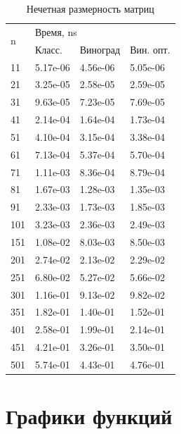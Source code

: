 \begin{table}[ht!]
\begin{subtable}[ht!]{0.45\textwidth}
		\caption{Нечетная размерность матриц}
		\begin{tabular}{||l|l|l|l||}
			\hline
			\multirow{2}{*}{n} & \multicolumn{3}{l|}{Время, ns} \\ \cline{2-4} 
			&  Класс. & Виноград & Вин. опт. \\ \hline\hline
			11 & 5.17e-06 & 4.56e-06 & 5.05e-06 \\ \hline 
			21 & 3.25e-05 & 2.58e-05 & 2.59e-05 \\ \hline 
			31 & 9.63e-05 & 7.23e-05 & 7.69e-05 \\ \hline 
			41 & 2.14e-04 & 1.64e-04 & 1.73e-04 \\ \hline 
			51 & 4.10e-04 & 3.15e-04 & 3.38e-04 \\ \hline 
			61 & 7.13e-04 & 5.37e-04 & 5.70e-04 \\ \hline 
			71 & 1.11e-03 & 8.36e-04 & 8.79e-04 \\ \hline 
			81 & 1.67e-03 & 1.28e-03 & 1.35e-03 \\ \hline 
			91 & 2.33e-03 & 1.73e-03 & 1.85e-03 \\ \hline 
			101 & 3.23e-03 & 2.36e-03 & 2.49e-03 \\ \hline 
			151 & 1.08e-02 & 8.03e-03 & 8.50e-03 \\ \hline 
			201 & 2.74e-02 & 2.13e-02 & 2.29e-02 \\ \hline 
			251 & 6.80e-02 & 5.27e-02 & 5.66e-02 \\ \hline 
			301 & 1.16e-01 & 9.13e-02 & 9.82e-02 \\ \hline 
			351 & 1.82e-01 & 1.40e-01 & 1.52e-01 \\ \hline 
			401 & 2.58e-01 & 1.99e-01 & 2.14e-01 \\ \hline 
			451 & 4.21e-01 & 3.26e-01 & 3.50e-01 \\ \hline 
			501 & 5.74e-01 & 4.43e-01 & 4.76e-01 \\ \hline 
		\end{tabular}
		\label{tab:even}
	\end{subtable}
	\label{tab:time}
\end{table} 

\newpage

\section{Графики функций}


